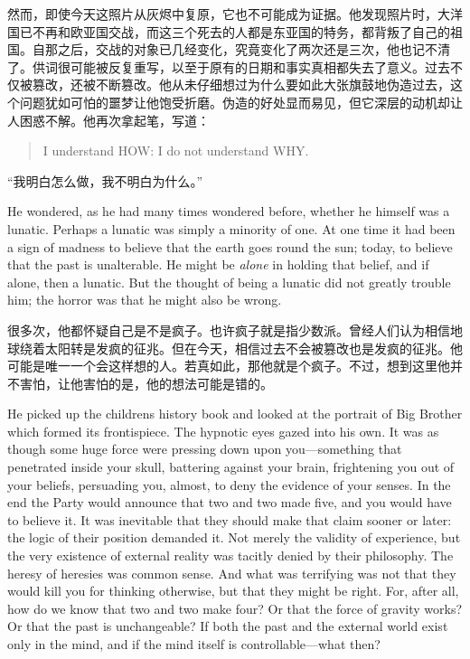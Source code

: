 \begin{paracol}{2}
\switchcolumn

然而，即使今天这照片从灰烬中复原，它也不可能成为证据。他发现照片时，大洋国已不再和欧亚国交战，而这三个死去的人都是东亚国的特务，都背叛了自己的祖国。自那之后，交战的对象已几经变化，究竟变化了两次还是三次，他也记不清了。供词很可能被反复重写，以至于原有的日期和事实真相都失去了意义。过去不仅被篡改，还被不断篡改。他从未仔细想过为什么要如此大张旗鼓地伪造过去，这个问题犹如可怕的噩梦让他饱受折磨。伪造的好处显而易见，但它深层的动机却让人困惑不解。他再次拿起笔，写道：

\switchcolumn*

\begin{quotation}
I understand HOW: I do not understand WHY.
\end{quotation}

\switchcolumn

``我明白怎么做，我不明白为什么。''

\switchcolumn*

He wondered, as he had many times wondered before, whether he himself
was a lunatic. Perhaps a lunatic was simply a minority of one. At one
time it had been a sign of madness to believe that the earth goes round
the sun; today, to believe that the past is unalterable. He might be
\emph{alone} in holding that belief, and if alone, then a lunatic. But
the thought of being a lunatic did not greatly trouble him; the horror
was that he might also be wrong.

\switchcolumn

很多次，他都怀疑自己是不是疯子。也许疯子就是指少数派。曾经人们认为相信地球绕着太阳转是发疯的征兆。但在今天，相信过去不会被篡改也是发疯的征兆。他可能是唯一一个会这样想的人。若真如此，那他就是个疯子。不过，想到这里他并不害怕，让他害怕的是，他的想法可能是错的。

\switchcolumn*

He picked up the children\textquotesingle s history book and looked at
the portrait of Big Brother which formed its frontispiece. The hypnotic
eyes gazed into his own. It was as though some huge force were pressing
down upon you---something that penetrated inside your skull, battering
against your brain, frightening you out of your beliefs, persuading you,
almost, to deny the evidence of your senses. In the end the Party would
announce that two and two made five, and you would have to believe it.
It was inevitable that they should make that claim sooner or later: the
logic of their position demanded it. Not merely the validity of
experience, but the very existence of external reality was tacitly
denied by their philosophy. The heresy of heresies was common sense. And
what was terrifying was not that they would kill you for thinking
otherwise, but that they might be right. For, after all, how do we know
that two and two make four? Or that the force of gravity works? Or that
the past is unchangeable? If both the past and the external world exist
only in the mind, and if the mind itself is controllable---what then?


\end{paracol}
